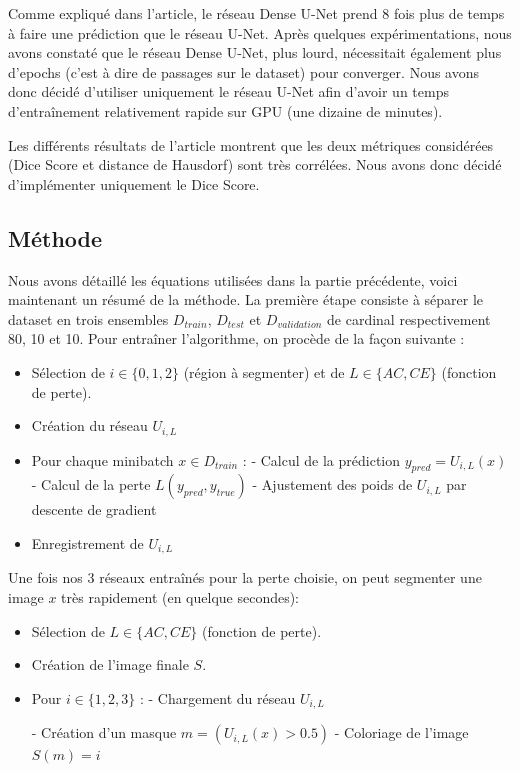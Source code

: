 \documentclass{article}
\begin{document}
Comme expliqué dans l'article, le réseau Dense U-Net prend 8 fois plus de temps à faire une prédiction que le réseau U-Net. Après quelques expérimentations, nous avons constaté que le réseau Dense U-Net, plus lourd, nécessitait également plus d'epochs (c'est à dire de passages sur le dataset) pour converger. Nous avons donc décidé d'utiliser uniquement le réseau U-Net afin d'avoir un temps d'entraînement relativement rapide sur GPU (une dizaine de minutes).

Les différents résultats de l'article montrent que les deux métriques considérées (Dice Score et distance de Hausdorf) sont très corrélées. Nous avons donc décidé d'implémenter uniquement le Dice Score.


\subsection{Méthode}

Nous avons détaillé les équations utilisées dans la partie précédente, voici maintenant un résumé de la méthode. La première étape consiste à séparer le dataset en trois ensembles  $D_{train}$, $D_{test}$ et $D_{validation}$ de cardinal respectivement 80, 10 et 10. Pour entraîner l'algorithme, on procède de la façon suivante : 
\vspace{5pt}
\begin{itemize}
\item Sélection de $i \in \{0, 1, 2\}$ (région à segmenter) et de $L \in \{ AC, CE\}$ (fonction de perte).
\item Création du réseau $U_{i, L}$

\item Pour chaque minibatch $x \in D_{train}$ :
\subitem - Calcul de la prédiction $y_{pred} = U_{i, L}(x)$
\subitem - Calcul de la perte $L(y_{pred}, y_{true})$
\subitem - Ajustement des poids de $U_{i, L}$ par descente de gradient
\item Enregistrement de $U_{i, L}$
\end{itemize} 
\vspace{5pt}

Une fois nos 3 réseaux entraînés pour la perte choisie, on peut segmenter une image $x$ très rapidement (en quelque secondes):

\vspace{5pt}
\begin{itemize}
\item Sélection de $L \in \{ AC, CE\}$ (fonction de perte).
\item Création de l'image finale $S$.

\item Pour $i \in \{1,2,3\}$ :
\subitem - Chargement du réseau $U_{i, L}$

\subitem - Création d'un masque $m = ( U_{i, L}(x) > 0.5)$
\subitem - Coloriage de l'image $S(m)=i$
\end{itemize} 
\vspace{5pt}
\end{document}
